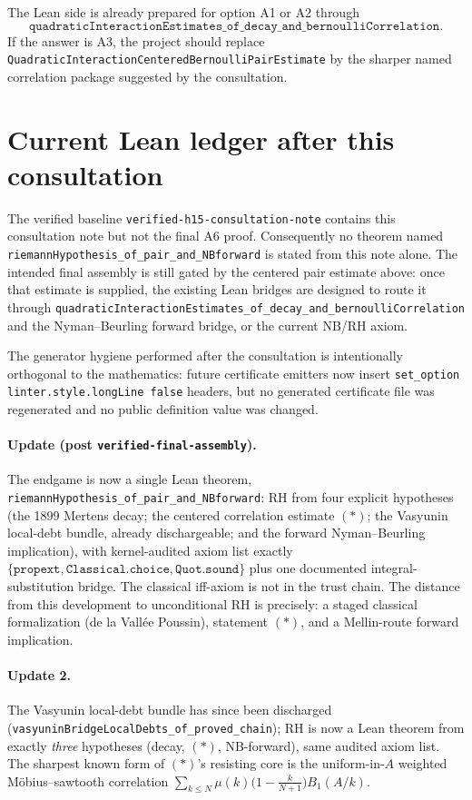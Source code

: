 \documentclass[11pt]{article}
\begin{document}
The Lean side is already prepared for option A1 or A2 through
\[
\texttt{quadraticInteractionEstimates\_of\_decay\_and\_bernoulliCorrelation}.
\]
If the answer is A3, the project should replace
\texttt{QuadraticInteractionCenteredBernoulliPairEstimate} by the sharper named
correlation package suggested by the consultation.

\section{Current Lean ledger after this consultation}

The verified baseline \texttt{verified-h15-consultation-note} contains this
consultation note but not the final A6 proof.  Consequently no theorem named
\texttt{riemannHypothesis\_of\_pair\_and\_NBforward} is stated from this note
alone.  The intended final assembly is still gated by the centered pair
estimate above: once that estimate is supplied, the existing Lean bridges are
designed to route it through
\texttt{quadraticInteractionEstimates\_of\_decay\_and\_bernoulliCorrelation}
and the Nyman--Beurling forward bridge, or the current NB/RH axiom.

The generator hygiene performed after the consultation is intentionally
orthogonal to the mathematics: future certificate emitters now insert
\texttt{set\_option linter.style.longLine false} headers, but no generated
certificate file was regenerated and no public definition value was changed.


\paragraph{Update (post \texttt{verified-final-assembly}).}
The endgame is now a single Lean theorem,
\texttt{riemannHypothesis\_of\_pair\_and\_NBforward}: RH from four explicit
hypotheses (the 1899 Mertens decay; the centered correlation estimate
$(\ast)$; the Vasyunin local-debt bundle, already dischargeable; and the
forward Nyman--Beurling implication), with kernel-audited axiom list exactly
$\{\texttt{propext}, \texttt{Classical.choice}, \texttt{Quot.sound}\}$ plus
one documented integral-substitution bridge. The classical iff-axiom is not
in the trust chain. The distance from this development to unconditional RH
is precisely: a staged classical formalization (de la Vall\'ee Poussin),
statement $(\ast)$, and a Mellin-route forward implication.


\paragraph{Update 2.} The Vasyunin local-debt bundle has since been
discharged (\texttt{vasyuninBridgeLocalDebts\_of\_proved\_chain}); RH is now
a Lean theorem from exactly \emph{three} hypotheses (decay, $(\ast)$,
NB-forward), same audited axiom list. The sharpest known form of $(\ast)$'s
resisting core is the uniform-in-$A$ weighted M\"obius--sawtooth correlation
$\sum_{k\le N}\mu(k)\bigl(1-\tfrac{k}{N+1}\bigr)B_1(A/k)$.
\end{document}
